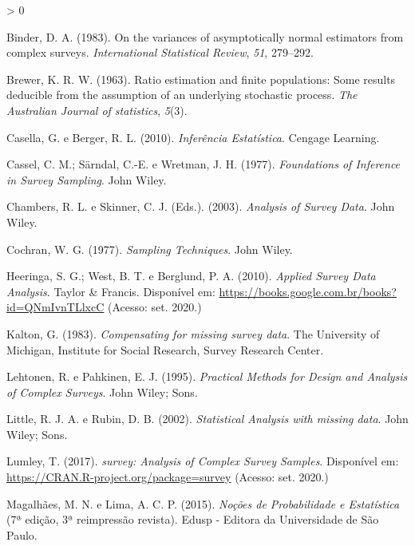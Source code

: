 \documentclass[
  12pt,
  brazilian,
]{book}
\newlength{\cslhangindent}
\newenvironment{CSLReferences}[2] %
 {%
  \setlength{\parindent}{0pt}
  \ifodd #1 \everypar{\setlength{\hangindent}{\cslhangindent}}\ignorespaces\fi
  \ifnum #2 > 0
  \setlength{\parskip}{#2\baselineskip}
  \fi
 }%
 {}
\theoremstyle{definition}
\theoremstyle{definition}
\theoremstyle{definition}
\theoremstyle{definition}
\theoremstyle{remark}
\begin{document}
\hypertarget{refs}{}
\begin{CSLReferences}{1}{0}
\leavevmode\hypertarget{ref-binder83}{}%
Binder, D. A. (1983). On the variances of asymptotically normal estimators from complex surveys. \emph{International Statistical Review}, \emph{51}, 279--292.

\leavevmode\hypertarget{ref-Brewer1963}{}%
Brewer, K. R. W. (1963). {Ratio estimation and finite populations: Some results deducible from the assumption of an underlying stochastic process}. \emph{The Australian Journal of statistics}, \emph{5}(3).

\leavevmode\hypertarget{ref-Casella}{}%
Casella, G. e Berger, R. L. (2010). \emph{Inferência Estatística}. Cengage Learning.

\leavevmode\hypertarget{ref-cassel}{}%
Cassel, C. M.; Särndal, C.-E. e Wretman, J. H. (1977). \emph{Foundations of Inference in Survey Sampling}. John Wiley.

\leavevmode\hypertarget{ref-CHSK2003}{}%
Chambers, R. L. e Skinner, C. J. (Eds.). (2003). \emph{Analysis of Survey Data}. John Wiley.

\leavevmode\hypertarget{ref-cochran}{}%
Cochran, W. G. (1977). \emph{Sampling Techniques}. John Wiley.

\leavevmode\hypertarget{ref-heeringa}{}%
Heeringa, S. G.; West, B. T. e Berglund, P. A. (2010). \emph{Applied Survey Data Analysis}. Taylor \& Francis. Disponível em: \url{https://books.google.com.br/books?id=QNmIvnTLlxcC} (Acesso: set. 2020.)

\leavevmode\hypertarget{ref-kalton83a}{}%
Kalton, G. (1983). \emph{Compensating for missing survey data}. The University of Michigan, Institute for Social Research, Survey Research Center.

\leavevmode\hypertarget{ref-lethonen}{}%
Lehtonen, R. e Pahkinen, E. J. (1995). \emph{Practical Methods for Design and Analysis of Complex Surveys}. John Wiley; Sons.

\leavevmode\hypertarget{ref-LR2002}{}%
Little, R. J. A. e Rubin, D. B. (2002). \emph{Statistical Analysis with missing data}. John Wiley; Sons.

\leavevmode\hypertarget{ref-R-survey}{}%
Lumley, T. (2017). \emph{survey: Analysis of Complex Survey Samples}. Disponível em: \url{https://CRAN.R-project.org/package=survey} (Acesso: set. 2020.)

\leavevmode\hypertarget{ref-Marcos}{}%
Magalhães, M. N. e Lima, A. C. P. (2015). \emph{Noções de Probabilidade e Estatística} (7ª edição, 3ª reimpressão revista). Edusp - Editora da Universidade de São Paulo.


\end{CSLReferences}
\end{document}
